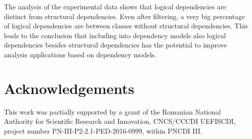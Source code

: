 \documentclass[a4paper,twoside]{article}
\begin{document}
The analysis of the experimental data shows that logical dependencies are distinct from structural dependencies. Even after filtering, a very big percentage of logical dependencies are between classes without structural dependencies. This leads to the conclusion that including into dependency models also logical dependencies besides structural dependencies has the potential to improve analysis applications based on dependency models.

\section{Acknowledgements}
 \label{sec:ack}

This work was partially supported by a grant of the Romanian National Authority for Scientiﬁc Research and Innovation, CNCS/CCCDI UEFISCDI, project number PN-III-P2-2.1-PED-2016-0999, within PNCDI III.

 

{\small
}
 
\end{document}
